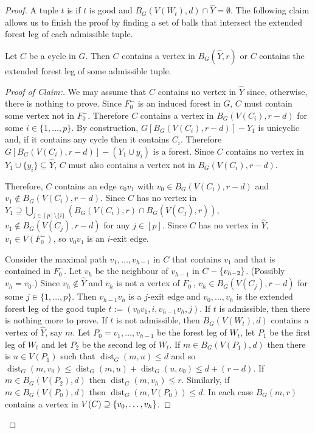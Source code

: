 \documentclass{patmorin}
\newcommand{\pat}[1]{\textcolor{Blue}{[Pat: #1]}}
\newcommand{\gwen}[1]{\textcolor{Purple}{Gwen: #1}}
\newenvironment{clmproof}{\begin{proof}[Proof of Claim:]\renewcommand{\qedsymbol}{\rule{1ex}{1ex}}}{\end{proof}}
\DeclareMathOperator{\dist}{dist}
\DeclarePairedDelimiter\set{\{}{\}}
\begin{document}
\begin{proof}
A tuple $t$ is  if $t$ is good and $B_G(V(W_t),d) \cap \widehat{Y} = \emptyset$.  The following claim 
allows us to finish the proof by finding a set of balls that intersect the extended forest leg of each admissible tuple.

\begin{clm}\label{hit_cycle}
  Let $C$ be a cycle in $G$.  Then  $C$ contains a vertex in $B_G(\widehat{Y},r)$ or $C$ contains the extended forest leg of some admissible tuple.
\end{clm}

\begin{clmproof}
  We may assume that $C$ contains no vertex in $\widehat{Y}$ since, otherwise, there is nothing to prove.
  Since $F_0^-$ is an induced forest in $G$, $C$ must contain some vertex not in $F_0^-$.  Therefore $C$ contains a vertex in $B_G(V(C_i),r-d)$  for some $i\in\{1,\ldots,p\}$. By construction, $G[B_G(V(C_i),r-d)]-Y_1$ is unicyclic and, if it contains any cycle then it contains $C_i$.  Therefore  $G[B_G(V(C_i),r-d)]-(Y_1\cup y_i)$ is a forest.  Since $C$ contains no vertex in $Y_1\cup\{y_i\}\subseteq \widehat{Y}$, $C$ must also contains a vertex not in $B_G(V(C_i),r-d)$.

  Therefore, $C$ contains an edge $v_0v_1$ with $v_0\in B_G(V(C_i),r-d)$ and $v_1\not\in B_G(V(C_i),r-d)$.  Since $C$ has no vertex in $Y_1\supseteq \bigcup_{j\in[p]\setminus\{i\}}(B_G(V(C_i),r)\cap B_G(V(C_j),r))$, $v_1\not\in B_G(V(C_j),r-d)$ for any $j\in[p]$. Since $C$ has no vertex in $\widehat{Y}$, $v_1\in V(F^-_0)$, so $v_0v_1$ is an $i$-exit edge.
  
  Consider the maximal path $v_1,\ldots,v_{h-1}$ in $C$ that contains $v_1$ and that is contained in $F_0^-$. Let $v_h$ be the neighbour of $v_{h-1}$ in $C-\set{v_{h-2}}$.  (Possibly $v_h=v_0$.)  Since $v_h\notin \widehat{Y}$ and $v_h$ is not a vertex of $F_0^-$, $v_h\in B_G(V(C_j),r-d)$ for some $j\in\{1,\ldots,p\}$.   Then $v_{h-1}v_h$ is a $j$-exit edge and $v_0,\ldots,v_{h}$ is the extended forest leg of the good tuple $t:=(v_0v_1,i,v_{h-1}v_h,j)$.   If $t$ is admissible, then there is nothing more to prove.  If $t$ is not admissible, 
  then $B_G(V(W_t),d)$ contains a vertex of $\widehat{Y}$, say $m$.  
  Let $P_0=v_1,\ldots,v_{h-1}$ be the forest leg of $W_t$, let $P_1$ be the first leg of $W_t$ and let $P_2$ be the second leg of $W_t$. 
  If $m\in B_G(V(P_1),d)$ then there is $u\in V(P_1)$ such that $\dist_G(m,u)\leq d$ and so 
  $\dist_G(m,v_0)\le \dist_G(m,u) + \dist_G(u,v_0)\le d + (r-d)$.  
  If $m\in B_G(V(P_2),d)$ then $\dist_G(m,v_h)\le r$.  Similarly, if $m\in B_G(V(P_0),d)$ then $\dist_G(m,V(P_0))\le d$.  In each case $B_G(m,r)$ contains a vertex in $V(C)\supseteq \set{v_0,\ldots,v_h}$.
\end{clmproof}


\end{proof}
\end{document}
